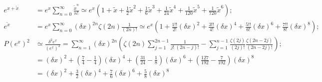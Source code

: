 \documentclass[twoside]{article}
\numberwithin{equation}{section}
\begin{document}
\begin{align*}
e^{x + \tilde{x}} &= e^x \sum_{n=0}^{\infty} \frac{\tilde{x}^n}{n!}
 \simeq e^x \left(1 + \tilde{x} + \frac{1}{2} \tilde{x}^2 + \frac{1}{6} \tilde{x}^3 + \frac{1}{24} \tilde{x}^4 + \frac{1}{120} \tilde{x}^5 + \frac{1}{720} \tilde{x}^6 \right); \\
\overline{e^x} &= e^x \sum_{n=0}^{\infty} (\delta x)^{2n} \zeta(2n) \frac{1}{(2n)!} 
 \simeq e^x \left(1 + \frac{1!!}{2!} (\delta x)^2 + \frac{3!!}{4!} (\delta x)^4 + \frac{5!!}{6!} (\delta x)^6 + \frac{7!!}{8!} (\delta x)^8 \right); \\
P(e^x)^2 &\simeq \frac{\delta^2 e^x}{(e^x)^2} =  \sum_{n=1}^{\infty} (\delta x)^{2n} \left( \zeta(2n) \sum_{j=1}^{2n-1} \frac{1}{j!\;(2n - j)!} 
   	- \sum_{j=1}^{n-1} \frac{\zeta(2j)}{(2j)!}  \frac{\zeta(2n - 2j)}{(2n - 2j)!} \right); \\
 &= (\delta x)^2 + (\frac{7}{4} - \frac{1}{4}) (\delta x)^4 + (\frac{31}{24} - \frac{1}{8}) (\delta x)^6
  + (\frac{127}{192} - \frac{7}{192}) (\delta x)^8 \\
 &= (\delta x)^2 + \frac{3}{2} (\delta x)^4 + \frac{7}{6} (\delta x)^6 + \frac{5}{8} (\delta x)^8
\end{align*}
\end{document}
